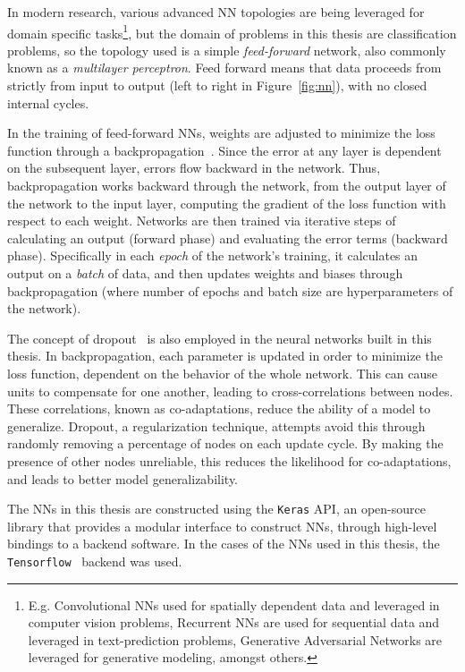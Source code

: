 In modern research, various advanced \gls{NN} topologies are being leveraged for domain specific tasks\footnote{E.g. Convolutional \glspl{NN} used for spatially dependent data and leveraged in computer vision problems, Recurrent \glspl{NN} are used for sequential data and leveraged in text-prediction problems, Generative Adversarial Networks are leveraged for generative modeling, amongst others.}, but the domain of problems in this thesis are classification problems, so the topology used is a simple \textit{feed-forward} network, also commonly known as a \textit{multilayer perceptron}. Feed forward means that data proceeds from strictly from input to output (left to right in Figure~\ref{fig:nn}), with no closed internal cycles.

In the training of feed-forward \glspl{NN}, weights are adjusted to minimize the loss function through a backpropagation~\cite{backprop}. Since the error at any layer is dependent on the subsequent layer, errors flow backward in the network. Thus, backpropagation works backward through the network, from the output layer of the network to the input layer, computing the gradient of the loss function with respect to each weight. Networks are then trained via iterative steps of calculating an output (forward phase) and evaluating the error terms (backward phase). Specifically in each \textit{epoch} of the network's training, it calculates an output on a \textit{batch} of data, and then updates weights and biases through backpropagation (where number of epochs and batch size are hyperparameters of the network).

The concept of dropout~\cite{dropout} is also employed in the neural networks built in this thesis. In backpropagation, each parameter is updated in order to minimize the loss function, dependent on the behavior of the whole network. This can cause units to compensate for one another, leading to cross-correlations between nodes. These correlations, known as co-adaptations, reduce the ability of a model to generalize. Dropout, a regularization technique, attempts avoid this through randomly removing a percentage of nodes on each update cycle. By making the presence of other nodes unreliable, this reduces the likelihood for co-adaptations, and leads to better model generalizability. 

The \glspl{NN} in this thesis are constructed using the \texttt{Keras} \gls{API}, an open-source library that provides a modular interface to construct \glspl{NN}, through high-level bindings to a backend software. In the cases of the \glspl{NN} used in this thesis, the \texttt{Tensorflow}~\cite{Tensorflow} backend was used.